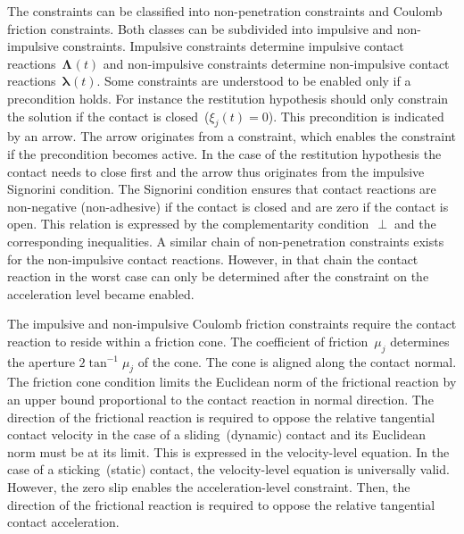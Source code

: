 \documentclass[global,twocolumn]{svjour}
\let\vec\bm
\newcommand{\compl}{~\bot~}
\newcommand{\cof}[1]{\ensuremath{\mu_{#1}}}
\newcommand{\contactforce}[1]{\ensuremath{\vec{\lambda}_{#1}}}
\newcommand{\contactimpulse}[1]{\ensuremath{\vec{\Lambda}_{#1}}}
\begin{document}
		The constraints can be classified
		into non-penetration constraints and Coulomb friction constraints. Both classes
		can be subdivided into impulsive and non-impulsive constraints. Impulsive constraints
		determine impulsive contact reactions~$\contactimpulse{}(t)$ and non-impulsive
		constraints determine non-impulsive contact reactions~$\contactforce{}(t)$.	Some constraints
		are understood to be enabled only if a precondition holds. For instance
		the restitution hypothesis should only constrain the solution if the contact is
		closed~($\xi_j(t) = 0$). This precondition is indicated by an arrow.
		The arrow originates from a constraint, which enables the constraint
		if the precondition becomes active. In the case of the restitution hypothesis the
		contact needs to close first and the arrow thus originates from the
		impulsive Signorini condition. The Signorini condition ensures that
		contact reactions are non-negative (non-adhesive) if the contact is
		closed and are zero if the contact is open. This relation is
		expressed by the complementarity condition~$\compl$ and the corresponding inequalities.
		A similar chain of non-penetration constraints exists for the
		non-impulsive contact reactions. However, in that chain the contact
		reaction in the worst case can only be determined after the constraint
		on the acceleration level became enabled.
		
		The impulsive and non-impulsive Coulomb friction constraints require
		the contact reaction to reside within a friction cone. The coefficient of
		friction~$\cof{j}$ determines the aperture $2 \tan^{-1} \cof{j}$
		of the cone. The cone is aligned along the contact normal. The friction
		cone condition limits the Euclidean norm of the frictional reaction by an
		upper bound proportional to the contact reaction in normal direction.
		The direction of the frictional reaction is required to oppose the
		relative tangential contact velocity in the case of a sliding~(dynamic)
		contact and its Euclidean norm must be at its limit. This is expressed in
		the velocity-level equation. In the case of a sticking~(static)
		contact, the velocity-level equation is universally valid. However, the
		zero slip enables the acceleration-level constraint. Then, the
		direction of the frictional reaction is required to oppose the relative
		tangential contact acceleration.
\end{document}
